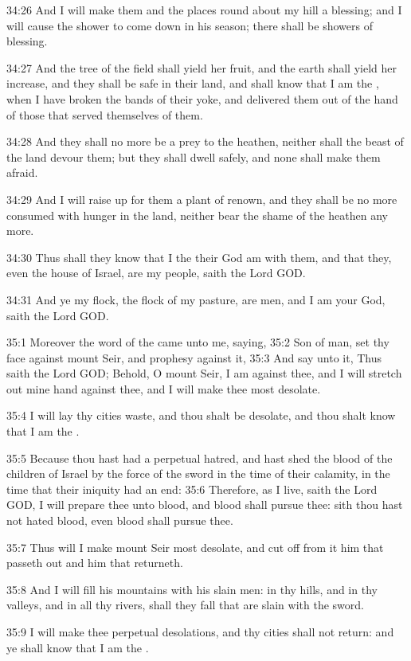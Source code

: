 34:26 And I will make them and the places round about my hill a
blessing; and I will cause the shower to come down in his season;
there shall be showers of blessing.

34:27 And the tree of the field shall yield her fruit, and the earth
shall yield her increase, and they shall be safe in their land, and
shall know that I am the \LORD, when I have broken the bands of their
yoke, and delivered them out of the hand of those that served
themselves of them.

34:28 And they shall no more be a prey to the heathen, neither shall
the beast of the land devour them; but they shall dwell safely, and
none shall make them afraid.

34:29 And I will raise up for them a plant of renown, and they shall
be no more consumed with hunger in the land, neither bear the shame of
the heathen any more.

34:30 Thus shall they know that I the \LORD their God am with them, and
that they, even the house of Israel, are my people, saith the Lord
GOD.

34:31 And ye my flock, the flock of my pasture, are men, and I am your
God, saith the Lord GOD.

35:1 Moreover the word of the \LORD came unto me, saying, 35:2 Son of
man, set thy face against mount Seir, and prophesy against it, 35:3
And say unto it, Thus saith the Lord GOD; Behold, O mount Seir, I am
against thee, and I will stretch out mine hand against thee, and I
will make thee most desolate.

35:4 I will lay thy cities waste, and thou shalt be desolate, and thou
shalt know that I am the \LORD.

35:5 Because thou hast had a perpetual hatred, and hast shed the blood
of the children of Israel by the force of the sword in the time of
their calamity, in the time that their iniquity had an end: 35:6
Therefore, as I live, saith the Lord GOD, I will prepare thee unto
blood, and blood shall pursue thee: sith thou hast not hated blood,
even blood shall pursue thee.

35:7 Thus will I make mount Seir most desolate, and cut off from it
him that passeth out and him that returneth.

35:8 And I will fill his mountains with his slain men: in thy hills,
and in thy valleys, and in all thy rivers, shall they fall that are
slain with the sword.

35:9 I will make thee perpetual desolations, and thy cities shall not
return: and ye shall know that I am the \LORD.

